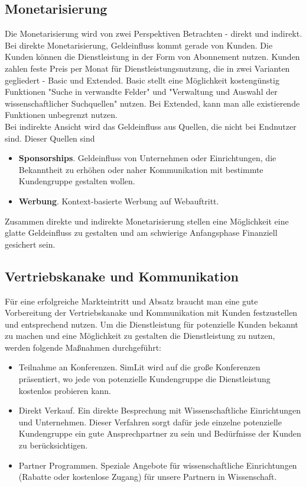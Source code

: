 \subsection{Monetarisierung}

Die Monetarisierung wird von zwei Perspektiven Betrachten - direkt und indirekt. Bei direkte Monetarisierung, Geldeinfluss kommt gerade von Kunden. Die Kunden können die Dienstleistung in der Form von Abonnement nutzen. Kunden zahlen feste Preis per Monat für Dienstleistungsnutzung, die in zwei Varianten gegliedert - Basic und Extended. Basic stellt eine Möglichkeit kostengünstig Funktionen "Suche in verwandte Felder" und "Verwaltung und Auswahl der wissenschaftlicher Suchquellen" nutzen. Bei Extended, kann man alle existierende Funktionen unbegrenzt nutzen.\\

Bei indirekte Ansicht wird das Geldeinfluss aus Quellen, die nicht bei Endnutzer sind. Dieser Quellen sind
\begin{itemize}
\item \textbf{Sponsorships}. Geldeinfluss von Unternehmen oder Einrichtungen, die Bekanntheit zu erhöhen oder naher Kommunikation mit bestimmte Kundengruppe gestalten wollen.
\item \textbf{Werbung}. Kontext-basierte Werbung auf Webauftritt.
\end{itemize}

Zusammen direkte und indirekte Monetarisierung stellen eine Möglichkeit eine glatte Geldeinfluss zu gestalten und am schwierige Anfangsphase Finanziell gesichert sein.

 
\subsection{Vertriebskanake und Kommunikation}

Für eine erfolgreiche Markteintritt und Absatz braucht man eine gute Vorbereitung der Vertriebskanake und Kommunikation mit Kunden festzustellen und entsprechend nutzen. Um die Dienstleistung für potenzielle Kunden bekannt zu machen und eine Möglichkeit zu gestalten die Dienstleistung zu nutzen, werden folgende Maßnahmen durchgeführt: 
\begin{itemize}
\item Teilnahme an Konferenzen. SimLit wird auf die große Konferenzen präsentiert, wo jede von potenzielle Kundengruppe die Dienstleistung kostenlos probieren kann.
\item Direkt Verkauf. Ein direkte Besprechung mit Wissenschaftliche Einrichtungen und Unternehmen. Dieser Verfahren sorgt dafür jede einzelne potenzielle Kundengruppe ein gute Ansprechpartner zu sein und Bedürfnisse der Kunden zu berücksichtigen.
\item Partner Programmen. Speziale Angebote für wissenschaftliche Einrichtungen (Rabatte oder kostenlose Zugang) für unsere Partnern in Wissenschaft.
\end{itemize}

